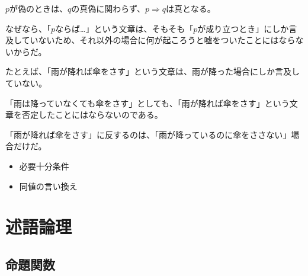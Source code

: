 \documentclass[../../imaging-math]{subfiles}
\begin{document}
$p$が偽のときは、$q$の真偽に関わらず、$p \Rightarrow q$は真となる。

なぜなら、「$p$ならば…」という文章は、そもそも「$p$が成り立つとき」にしか言及していないため、それ以外の場合に何が起ころうと嘘をついたことにはならないからだ。

\br

たとえば、「雨が降れば傘をさす」という文章は、雨が降った場合にしか言及していない。

「雨は降っていなくても傘をさす」としても、「雨が降れば傘をさす」という文章を否定したことにはならないのである。

「雨が降れば傘をさす」に反するのは、「雨が降っているのに傘をささない」場合だけだ。

\begin{mindflow}
  \begin{itemize}
    \item 必要十分条件
    \item 同値の言い換え
  \end{itemize}
\end{mindflow}

\section{述語論理}

\subsection{命題関数}
\end{document}
